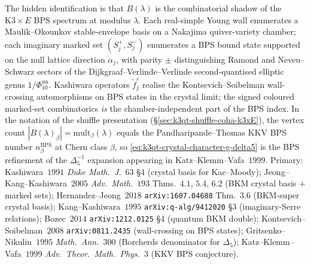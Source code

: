 \begin{remark}[Crystal vertices \texorpdfstring{$=$}{=} BPS states modulo wall-crossing]
\label{rem:k3qt-crystal-basis-bps-enumeration}
The hidden identification is that $B(\lambda)$ is the combinatorial
shadow of the $\mathrm{K3} \times E$ BPS spectrum at modulus
$\lambda$. Each real-simple Young wall enumerates a Maulik--Okounkov
stable-envelope basis on a Nakajima quiver-variety chamber; each
imaginary marked set $(S_j^+, S_j^-)$ enumerates a BPS bound state
supported on the null lattice direction $\alpha_j$, with parity $\pm$
distinguishing Ramond and Neveu--Schwarz sectors of the
Dijkgraaf--Verlinde--Verlinde second-quantised elliptic genus
\(1/\Phi_{10}^{\mathrm{un}}\). Kashiwara operators $\tilde f_j^\varepsilon$ realise
the Kontsevich--Soibelman wall-crossing automorphisms on BPS states
in the crystal limit; the signed coloured marked-set combinatorics
\emph{is} the chamber-independent part of the BPS index. In the
notation of the shuffle presentation
(\S\ref{sec:k3qt-shuffle-coha-k3xE}), the vertex count
$|B(\lambda)_\beta| = \mathrm{mult}_\beta(\lambda)$ equals the
Pandharipande--Thomas KKV BPS number $n_\beta^{\mathrm{BPS}}$ at
Chern class $\beta$, so \eqref{eq:k3qt-crystal-character-g-delta5}
is the BPS refinement of the $\Delta_5^{-1}$ expansion appearing in
Katz--Klemm--Vafa~$1999$. Primary: Kashiwara~$1991$
\emph{Duke Math.~J.}~$63$ \S$4$ (crystal basis for Kac--Moody);
Jeong--Kang--Kashiwara~$2005$ \emph{Adv.~Math.}~$193$ Thms.~$4.1$,
$5.4$, $6.2$ (BKM crystal basis + marked sets);
Hernandez--Jeong~$2018$ \texttt{arXiv:1607.04688} Thm.~$3.6$
(BKM-super crystal basis);
Kang--Kashiwara~$1995$ \texttt{arXiv:q-alg/9412020} \S$3$
(imaginary-Serre relations);
Bozec~$2014$ \texttt{arXiv:1212.0125} \S$4$ (quantum BKM double);
Kontsevich--Soibelman~$2008$ \texttt{arXiv:0811.2435}
(wall-crossing on BPS states);
Gritsenko--Nikulin~$1995$ \emph{Math.~Ann.}~$300$
(Borcherds denominator for $\Delta_5$);
Katz--Klemm--Vafa~$1999$ \emph{Adv.~Theor.~Math.~Phys.}~$3$
(KKV BPS conjecture).
\end{remark}


